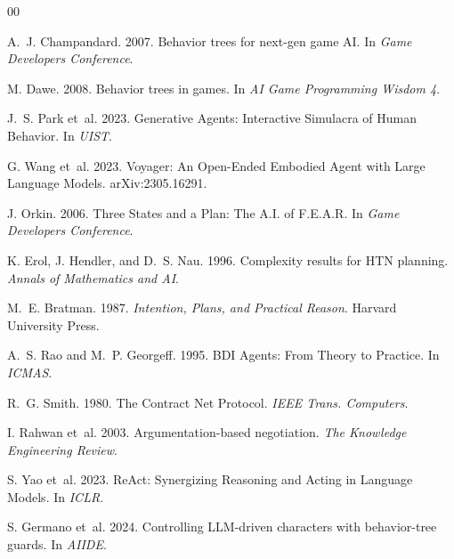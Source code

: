 \documentclass[sigconf, authorversion]{acmart}
\begin{document}

\begin{thebibliography}{00}

A.~J. Champandard. 2007. Behavior trees for next-gen game AI. In \emph{Game Developers Conference}.

M. Dawe. 2008. Behavior trees in games. In \emph{AI Game Programming Wisdom 4}.

J.~S. Park et~al. 2023. Generative Agents: Interactive Simulacra of Human Behavior. In \emph{UIST}.

G. Wang et~al. 2023. Voyager: An Open-Ended Embodied Agent with Large Language Models. arXiv:2305.16291.

J. Orkin. 2006. Three States and a Plan: The A.I. of F.E.A.R. In \emph{Game Developers Conference}.

K. Erol, J. Hendler, and D.~S. Nau. 1996. Complexity results for HTN planning. \emph{Annals of Mathematics and AI}.

M.~E. Bratman. 1987. \emph{Intention, Plans, and Practical Reason}. Harvard University Press.

A.~S. Rao and M.~P. Georgeff. 1995. BDI Agents: From Theory to Practice. In \emph{ICMAS}.

R.~G. Smith. 1980. The Contract Net Protocol. \emph{IEEE Trans. Computers}.

I. Rahwan et~al. 2003. Argumentation-based negotiation. \emph{The Knowledge Engineering Review}.

S. Yao et~al. 2023. ReAct: Synergizing Reasoning and Acting in Language Models. In \emph{ICLR}.

S. Germano et~al. 2024. Controlling LLM-driven characters with behavior-tree guards. In \emph{AIIDE}.

\end{thebibliography}
\end{document}
